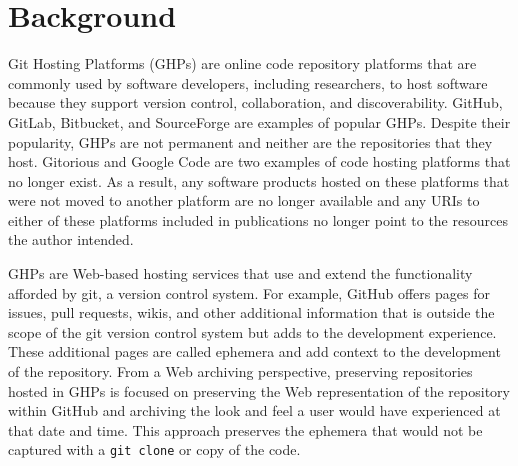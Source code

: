 \chapter{Background}
\label{ch:background}


Git Hosting Platforms (GHPs) are online code repository platforms that are commonly used by software developers, including researchers, to host software because they support version control, collaboration, and discoverability. GitHub, GitLab, Bitbucket, and SourceForge are examples of popular GHPs. Despite their popularity, GHPs are not permanent and neither are the repositories that they host. Gitorious and Google Code are two examples of code hosting platforms that no longer exist. As a result, any software products hosted on these platforms that were not moved to another platform are no longer available and any URIs to either of these platforms included in publications no longer point to the resources the author intended.  

GHPs are Web-based hosting services that use and extend the functionality afforded by git, a version control system. For example, GitHub offers pages for issues, pull requests, wikis, and other additional information that is outside the scope of the git version control system but adds to the development experience. These additional pages are called ephemera and add context to the development of the repository. From a Web archiving perspective, preserving repositories hosted in GHPs is focused on preserving the Web representation of the repository within GitHub and archiving the look and feel a user would have experienced at that date and time. This approach preserves the ephemera that would not be captured with a \verb|git clone| or copy of the code. 


